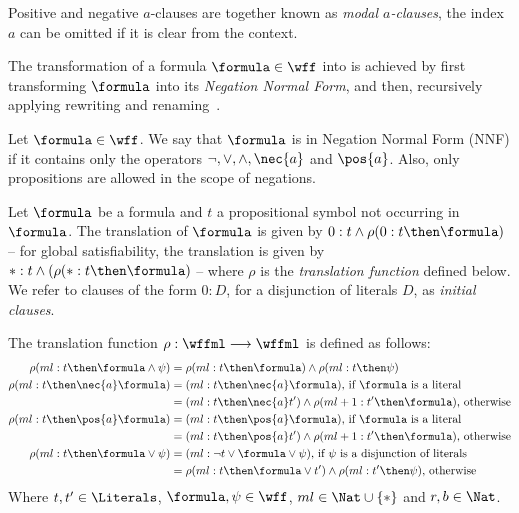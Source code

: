 Positive and negative $a$-clauses are together known as \emph{modal
$a$-clauses}, the index $a$ can be omitted if it is clear from the context.

The transformation of a formula $\formula \in \wff$ into  is achieved
by first transforming $\formula$ into its \emph{Negation Normal Form}, and then,
recursively applying rewriting and renaming~\cite{plaisted1986structure}.

\begin{definition}
    Let $\formula \in \wff$. We say that $\formula$ is in Negation Normal Form (NNF) if
    it contains only the operators $\neg, \lor, \land, \nec{a}$ and $\pos{a}$. Also,
    only propositions are allowed in the scope of negations.
\end{definition}

Let $\formula$ be a formula and $t$ a propositional symbol not occurring in
$\formula$. The translation of $\formula$ is given by $0 : t \land \rho(0 : t
\then \formula)$ -- for global satisfiability, the translation is given by $* :
t \land (\rho(* : t \then \formula)$ -- where $\rho$ is the \emph{translation
function} defined below. We refer to clauses of the form $0 : D$, for a
disjunction of literals $D$, as \emph{initial clauses}. 

\begin{definition}
    The translation function $\rho : \wffml \longrightarrow \wffml$ is defined
    as follows:
        \begin{align*}
            \rho(ml : t \then \formula \land \psi) & = \rho(ml : t \then \formula) \land \rho(ml : t \then \psi) \\
            \rho(ml : t \then \nec{a} \formula) & = (ml : t \then \nec{a} \formula) \text{, if \formula\ is a literal}\\
                                                & = (ml : t \then \nec{a} t') \land \rho(ml+1 : t' \then \formula) \text{, otherwise}\\
            \rho(ml : t \then \pos{a} \formula) & = (ml : t \then \pos{a} \formula) \text{, if \formula\ is a literal}\\
                                                & = (ml : t \then \pos{a} t') \land \rho(ml+1 : t' \then \formula) \text{, otherwise}\\
            \rho(ml : t \then \formula \lor \psi) & = (ml : \neg t \lor \formula
            \lor \psi) \text{, if $\psi$ is a disjunction of literals}\\
                                                  & = \rho(ml : t \then \formula \lor t') \land \rho(ml : t' \then \psi) \text{, otherwise}
        \end{align*}
        Where $t, t' \in \Literals$, $\formula, \psi \in \wff$, $ml \in
        \Nat \cup \{*\}$ and $r, b \in \Nat$.
\end{definition}


